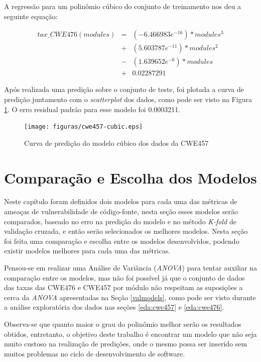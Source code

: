 A regressão para um polinômio cúbico do conjunto de treinamento nos deu a
seguinte equação:

\begin{align*}
 tax\_CWE476(modules) &=& (-6.466983e^{-16}) * modules^{3} \\
                      &+& (5.603787e^{-11}) * modules^{2} \\
                      &-& (1.639652e^{-6}) * modules \\
                      &+& 0.02287291
\end{align*}

Após realizada uma predição sobre o conjunto de teste, foi plotada a curva de
predição juntamento com o \textit{scatterplot} dos dados, como pode ser visto na
Figura \ref{fig:cwe457-cubic}. O erro residual padrão para esse modelo foi
0.0003211.

\begin{figure}[h]
  \centering
  \texttt{[image: figuras/cwe457-cubic.eps]}
      \caption{Curva de predição do modelo cúbico dos dados da CWE457}
  \label{fig:cwe457-cubic}
\end{figure}




\section{Comparação e Escolha dos Modelos}\label{comparacaomodelos}

Neste capítulo foram definidos dois modelos para cada uma das
métricas de ameaças de vulnerabilidade de código-fonte, nesta seção esses
modelos serão comparados, baseado no erro na predição do modelo e no método
\textit{K-fold} de validação cruzada, e então serão selecionados os melhores
modelos. Nesta seção foi feita uma comparação e escolha entre os modelos
desenvolvidos, podendo existir modelos melhores para cada uma das métricas.

Pensou-se em realizar uma Análise de Variância (\textit{ANOVA}) para tentar
auxiliar na comparação entre os modelos, mas não foi possível já que o conjunto
de dados das taxas das CWE476 e CWE457 por módulo não respeitam as suposições a
cerca da \textit{ANOVA} apresentadas na Seção \ref{valmodels}, como pode ser visto
durante a análise exploratória dos dados nas seções \ref{eda:cwe457} e
\ref{eda:cwe476}.

Observa-se que quanto maior o grau do polinômio melhor serão os resultados
obtidos, entretanto, o objetivo deste trabalho é encontrar um modelo que não
seja muito custoso na realização de predições, onde o mesmo possa ser inserido
sem muitos problemas no ciclo de desenvolvimento de software.


